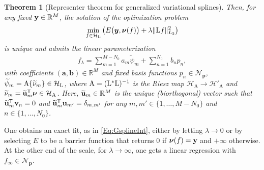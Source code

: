 \documentclass[11pt, english,english]{article}
\newtheorem{theorem}{Theorem}
\newcommand{\inR}{\in \mathbb{R}}
\newcommand{\R}{ \mathbb{R}}
\newcommand{\Lop}{{\rm L}}
\def\V#1{{\boldsymbol{#1}}}         %
\def\Spc#1{{\mathcal{#1}}}  %
\def\M#1{{\bf{#1}}}  %
\def\Op#1{{\mathrm{#1}}}  %
\renewcommand{\[}{\begin{equation}}
\renewcommand{\]}[1]{\label{eq:#1}\end{equation}}
\newcommand{\Tr}{\mathsf{T}}
\begin{document}
\begin{theorem}[Representer theorem for generalized variational splines]
Then, for any fixed $\M y\inR^M$,  the solution of the optimization problem
\begin{align}
\label{Eq:GenericOptimizationProb2}
\min_{f \in \Spc H_\Lop} \left( E\big(\V y, \V \nu(f)\big)+ \lambda \|\Lop f\|^2_{L_2}\right)
\end{align}
is unique and admits the linear parameterization 
\begin{align}
\label{Eq:f0lin2}
f_\lambda=\sum_{m=1}^{M-N_0} a_m \widetilde{\psi}_m +\sum_{n=1}^{N_0} b_{n} p_n,
\end{align}
with coefficients $(\V a,\V b)\inR^{M}$ and 
fixed basis functions $p_n\in \Spc N_\V p$, $\widetilde{\psi}_m=\Op A\{\widetilde{\nu}_m\}\in \Spc H_{\Lop}$, where
$\Op A=(\Lop^\ast\Lop)^{-1}$ is the Riesz map $\Spc H_{\Op A} \to \Spc H'_{\Op A} $ 
and  $\widetilde{\nu}_m=\widetilde{\M u}_m^\Tr\V \nu \in \Spc H_\Op A$. Here, $\widetilde{\M u}_m \in\R^M$ is the unique (biorthogonal) vector such that $\widetilde{\M u}^\Tr_m\M v_n=0$ and $\widetilde{\M u}^\Tr_m\M u_{m'}=\delta_{m,m'}$
for any $m,m' \in \{1,\dots,M-N_0\}$ and $n\in \{1,\dots,N_0\}$.




\end{theorem}


One obtains an exact fit, as in \eqref{Eq:GsplineInt}, either by letting $\lambda\to 0$ or by selecting $E$ to be a barrier function that returns
$0$ if $\V \nu(f)=\M y$ and $+\infty$ otherwise. At the other end of the scale, for $\lambda\to \infty$, one gets a linear regression with $f_\infty \in \Spc N_{\V p}$.
\end{document}
